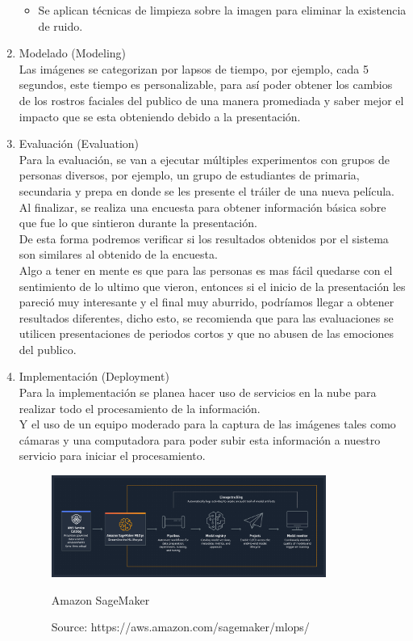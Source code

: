 \begin{enumerate}
\begin{itemize}
                  \item Se aplican técnicas de limpieza sobre la imagen para eliminar la existencia de
                        ruido.
            \end{itemize}

      \item Modelado (Modeling) \\Las imágenes se categorizan por lapsos de tiempo, por
            ejemplo, cada 5 segundos, este tiempo es personalizable, para así poder obtener
            los cambios de los rostros faciales del publico de una manera promediada y
            saber mejor el impacto que se esta obteniendo debido a la presentación.

      \item Evaluación (Evaluation) \\Para la evaluación, se van a ejecutar múltiples
            experimentos con grupos de personas diversos, por ejemplo, un grupo de
            estudiantes de primaria, secundaria y prepa en donde se les presente el tráiler
            de una nueva película. \\Al finalizar, se realiza una encuesta para obtener
            información básica sobre que fue lo que sintieron durante la presentación. \\De
            esta forma podremos verificar si los resultados obtenidos por el sistema son
            similares al obtenido de la encuesta. \\Algo a tener en mente es que para las
            personas es mas fácil quedarse con el sentimiento de lo ultimo que vieron,
            entonces si el inicio de la presentación les pareció muy interesante y el final
            muy aburrido, podríamos llegar a obtener resultados diferentes, dicho esto, se
            recomienda que para las evaluaciones se utilicen presentaciones de periodos
            cortos y que no abusen de las emociones del publico.

      \item Implementación (Deployment) \\Para la implementación se planea hacer uso de
            servicios en la nube para realizar todo el procesamiento de la información. \\Y
            el uso de un equipo moderado para la captura de las imágenes tales como cámaras
            y una computadora para poder subir esta información a nuestro servicio para
            iniciar el procesamiento.
            \begin{figure}[h]
                  \centering
                  \includegraphics[width=9cm]{figures/sageMakerAWS.png}
                  \caption{Amazon SageMaker}
                  \caption*{Source: https://aws.amazon.com/sagemaker/mlops/}
            \end{figure}
\end{enumerate}